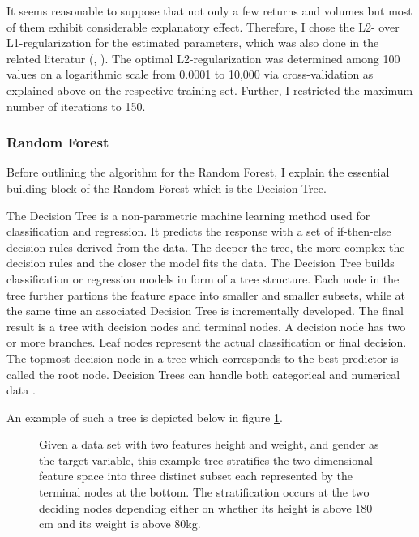 It seems reasonable to suppose that not only a few returns and volumes but most of them exhibit considerable explanatory effect.
Therefore, I chose the L2- over L1-regularization for the estimated parameters, 
which was also done in the related literatur (\cite{fischer2017lstmMarketPrediction}, \cite{krauss2019statisticalArbitrage}).
The optimal L2-regularization was
determined among 100 values on a logarithmic scale from 0.0001 to 10,000 via cross-validation as explained above
on the respective training set. Further, I restricted the maximum number of iterations to 150.


\subsubsection{Random Forest} \label{ch:random_forest}

Before outlining the algorithm for the Random Forest, I explain the essential 
building block of the Random Forest which is the Decision Tree.

The Decision Tree is a non-parametric machine learning method used for classification and regression.
It predicts the response with a set of if-then-else decision rules derived from the data.
The deeper the tree, the more complex the decision rules and the closer the model fits the data.
The Decision Tree builds classification or regression models in form of a tree structure.
Each node in the tree further partions the feature space into smaller and smaller subsets, 
while at the same time an associated Decision Tree is incrementally developed.
The final result is a tree with decision nodes and terminal nodes. 
A decision node has two or more branches.
Leaf nodes represent the actual classification or final decision. 
The topmost decision node in a tree which corresponds to the best predictor is called the root node.
Decision Trees can handle both categorical and numerical data \cite{james2013statisticalLearning}.

An example of such a tree is depicted below in figure \ref{fig:decision_tree_example}.

\begin{figure}[H]
    \captionsetup{format=plain}
    \caption{Given a data set with two features height and weight, and gender as the target variable, 
             this example tree stratifies the two-dimensional feature space into three distinct subset each 
             represented by the terminal nodes at the bottom.
             The stratification occurs at the two deciding nodes depending either on whether its height is above 180 cm 
             and its weight is above 80kg.
             }
    \label{fig:decision_tree_example}
\end{figure}

